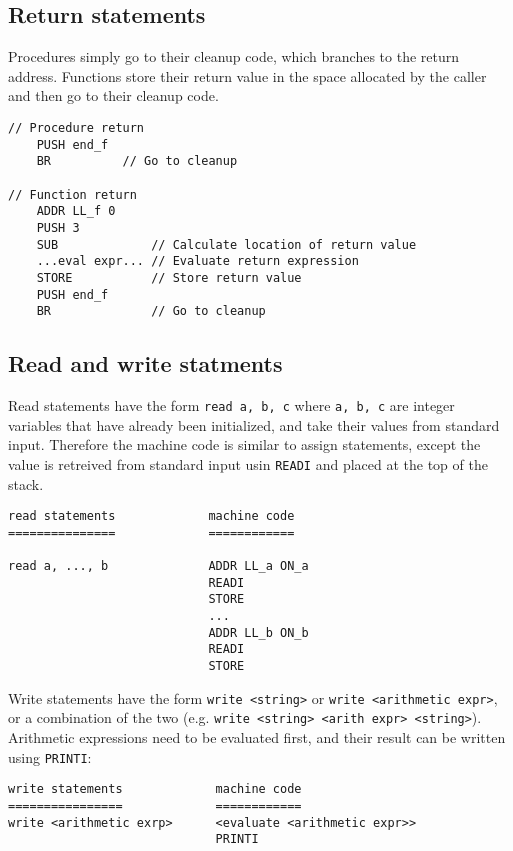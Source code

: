 \documentclass[11pt]{article}
\begin{document}
\subsection{Return statements}

Procedures simply go to their cleanup code, which branches to the return
address. Functions store their return value in the space allocated by the
caller and then go to their cleanup code.

\begin{verbatim}
// Procedure return
    PUSH end_f
    BR          // Go to cleanup

// Function return
    ADDR LL_f 0
    PUSH 3
    SUB             // Calculate location of return value
    ...eval expr... // Evaluate return expression
    STORE           // Store return value
    PUSH end_f
    BR              // Go to cleanup
\end{verbatim}

\subsection{Read and write statments}

Read statements have the form \texttt{read a, b, c} where \texttt{a, b, c} are integer variables that have already been initialized, and take their values from standard input. Therefore the machine code is similar to assign statements, except the value is retreived from standard input usin \texttt{READI} and placed at the top of the stack.

\begin{verbatim}
read statements             machine code
===============             ============

read a, ..., b              ADDR LL_a ON_a
                            READI
                            STORE
                            ...
                            ADDR LL_b ON_b
                            READI
                            STORE
\end{verbatim}

Write statements have the form \texttt{write <string>} or \texttt{write <arithmetic expr>}, or a combination of the two (e.g. \texttt{write <string> <arith expr> <string>}). Arithmetic expressions need to be evaluated first, and their result can be written using \texttt{PRINTI}:

\begin{verbatim}
write statements             machine code
================             ============
write <arithmetic exrp>      <evaluate <arithmetic expr>>
                             PRINTI
\end{verbatim}
\end{document}
